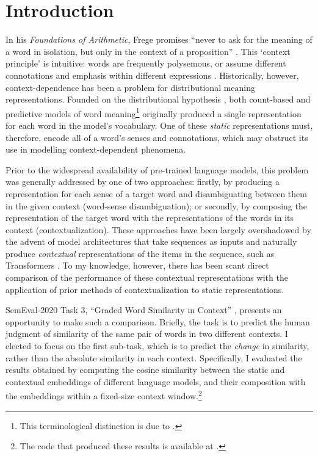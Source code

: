 \section{Introduction}
\label{sec:introduction}

In his \emph{Foundations of Arithmetic}, Frege promises ``never to ask for the meaning
of a word in isolation, but only in the context of a proposition''
\parencite*[xvii]{Frege1980}.
This `context principle' is intuitive: words are frequently polysemous, or assume
different connotations and emphasis within different expressions
\parencite[2-3]{Armendariz2020}.
Historically, however, context-dependence has been a problem for distributional meaning
representations.
Founded on the distributional hypothesis \parencite[e.g.,][142-143]{Turney2010}, both
count-based and predictive models of word meaning\footnote{ This terminological
  distinction is due to \textcite{Baroni2014a}.
} originally
produced a single representation for each word in the model's vocabulary.
One of these \emph{static} representations must, therefore, encode all of a word's
senses and connotations, which may obstruct its use in modelling context-dependent
phenomena.

Prior to the widespread availability of pre-trained language models, this problem was
generally addressed by one of two approaches: firstly, by producing a representation
for each sense of a target word and disambiguating between them in the given context
(word-sense disambiguation); or secondly, by composing the representation of the target
word with the representations of the words in its context (contextualization).
These approaches have been largely overshadowed by the advent of model architectures
that take sequences as inputs and naturally produce \emph{contextual} representations
of the items in the sequence, such as Transformers \parencite{Vaswani2017}.
To my knowledge, however, there has been scant direct comparison of the performance of
these contextual representations with the application of prior methods of
contextualization to static representations.

SemEval-2020 Task 3, ``Graded Word Similarity in Context'' \parencite{Armendariz2020a},
presents an opportunity to make such a comparison.
Briefly, the task is to predict the human judgment of similarity of the same pair of
words in two different contexts.
I elected to focus on the first sub-task, which is to predict the \emph{change} in
similarity, rather than the absolute similarity in each context.
Specifically, I evaluated the results obtained by computing the cosine similarity
between the static and contextual embeddings of different language models, and their
composition with the embeddings within a fixed-size context window.\footnote{The code
  that produced these results is available at
  .
}
